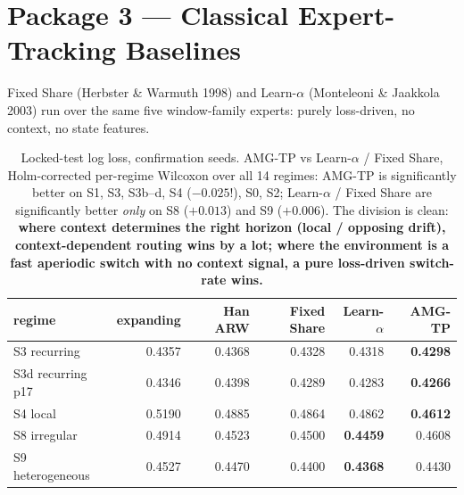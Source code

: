 \documentclass[11pt]{article}
\begin{document}
\section{Package 3 --- Classical Expert-Tracking Baselines}

Fixed Share (Herbster \& Warmuth 1998) and Learn-$\alpha$ (Monteleoni \& Jaakkola
2003) run over the same five window-family experts: purely loss-driven, no
context, no state features.

\begin{table}[H]
\centering
\small
\begin{tabular}{@{}lrrrrr@{}}
\toprule
regime & expanding & Han ARW & Fixed Share & Learn-$\alpha$ & AMG-TP \\
\midrule
S3 recurring        & 0.4357 & 0.4368 & 0.4328 & 0.4318 & \textbf{0.4298} \\
S3d recurring p17   & 0.4346 & 0.4398 & 0.4289 & 0.4283 & \textbf{0.4266} \\
S4 local            & 0.5190 & 0.4885 & 0.4864 & 0.4862 & \textbf{0.4612} \\
S8 irregular        & 0.4914 & 0.4523 & 0.4500 & \textbf{0.4459} & 0.4608 \\
S9 heterogeneous    & 0.4527 & 0.4470 & 0.4400 & \textbf{0.4368} & 0.4430 \\
\bottomrule
\end{tabular}
\caption{Locked-test log loss, confirmation seeds. AMG-TP vs Learn-$\alpha$ /
Fixed Share, Holm-corrected per-regime Wilcoxon over all 14 regimes: AMG-TP is
significantly better on S1, S3, S3b--d, S4 ($-0.025$!), S0, S2; Learn-$\alpha$ /
Fixed Share are significantly better \emph{only} on S8 ($+0.013$) and S9
($+0.006$). The division is clean: \textbf{where context determines the right
horizon (local / opposing drift), context-dependent routing wins by a lot; where
the environment is a fast aperiodic switch with no context signal, a pure
loss-driven switch-rate wins.}}
\end{table}
\end{document}
